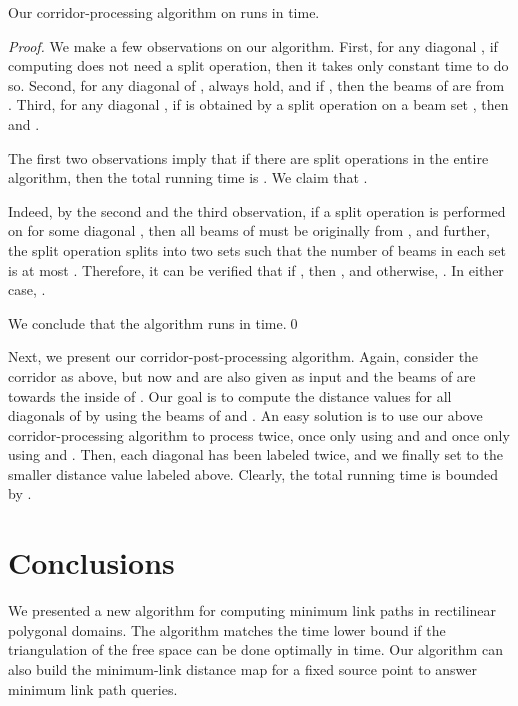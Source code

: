 \documentclass[english,runningheads,11pt]{llncs-revised}
\begin{document}
\begin{lemma}
Our corridor-processing algorithm on  runs in  time.
\end{lemma}
\begin{proof}
We make a few
observations on our algorithm. First,
for any diagonal , if computing  does not need a split
operation, then it takes only constant time to do so.
Second, for any diagonal  of , 
always hold, and if , then the beams of  are from
. Third, for any diagonal , if  is obtained by a split
operation on a beam set , then  and .

The first two observations imply that if there are  split
operations in the entire algorithm, then the total running
time is . We claim that .

Indeed, by the second and the third observation, if a split operation is performed on  for some diagonal , then all beams of  must be originally from , and further, the split operation splits  into two sets such that the number of beams in each set is at most . Therefore, it can be verified that if , then , and otherwise, . In either case, .

We conclude that the algorithm runs in  time.\qed
\end{proof}

Next, we present our corridor-post-processing algorithm. Again,
consider the corridor  as above, but now  and
 are also given as input and the beams of  are towards
the inside of .
Our goal is to compute the distance values for
all diagonals of  by using the beams of  and .
An easy solution is to use our above corridor-processing algorithm to process
 twice, once only using  and  and once only using
 and . Then, each diagonal  has
been labeled twice, and we finally set  to the smaller distance value
labeled above. Clearly, the total running time is bounded by
.

\section{Conclusions}
\label{sec:conclude}

We presented a new algorithm for computing minimum
link paths in rectilinear polygonal domains. The algorithm
matches the  time lower bound \cite{ref:MaheshwariLi00}
if the triangulation of the free space can be done optimally in  time.
Our algorithm can also build the minimum-link distance map for a fixed source point to answer minimum link
path queries.
\end{document}
